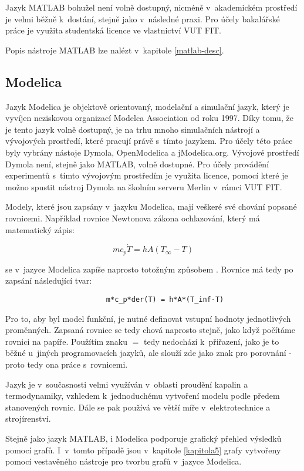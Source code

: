 Jazyk MATLAB bohužel není volně dostupný, nicméně v~akademickém prostředí je velmi běžně k~dostání, stejně jako v~následné praxi. Pro účely bakalářské práce je využita studentská licence ve vlastnictví VUT FIT.

Popis nástroje MATLAB lze nalézt v~kapitole \ref{matlab-desc}.
\subsection{Modelica}
Jazyk Modelica je objektově orientovaný, modelační a simulační jazyk, který je vyvíjen neziskovou organizací Modelca Association od roku 1997. Díky tomu, že je tento jazyk volně dostupný, je na trhu mnoho simulačních nástrojí a vývojových prostředí, které pracují právě s~tímto jazykem. Pro účely této práce byly vybrány nástoje Dymola, OpenModelica a jModelica.org. Vývojové prostředí Dymola není, stejně jako MATLAB, volně dostupné. Pro účely provádění experimentů s~tímto vývojovým prostředím je využita licence, pomocí které je možno spustit nástroj Dymola na školním serveru Merlin v~rámci VUT FIT.

Modely, které jsou zapsány v~jazyku Modelica, mají veškeré své chování popsané rovnicemi. Například rovnice Newtonova zákona ochlazování, který má matematický zápis:

\begin{equation}
    mc_p\Dot{T} = hA(T_{\infty} - T)
\end{equation}

se v~jazyce Modelica zapíše naprosto totožným způsobem \cite{modelica-example}. Rovnice má tedy po zapsání následující tvar:

\begin{verbatim}
                        m*c_p*der(T) = h*A*(T_inf-T)
\end{verbatim}

Pro to, aby byl model funkční, je nutné definovat vstupní hodnoty jednotlivých proměnných. Zapsaná rovnice se tedy chová naprosto stejně, jako když počítáme rovnici na papíře. Použítím znaku $ = $ tedy nedochází k~přiřazení, jako je to běžné u~jiných programovacích jazyků, ale slouží zde jako znak pro porovnání - proto tedy ona práce s~rovnicemi.

Jazyk je v~současnosti velmi využíván v~oblasti proudění kapalin a termodynamiky, vzhledem k~jednoduchému vytvoření modelu podle předem stanovených rovnic. Dále se pak používá ve větší míře v~elektrotechnice a strojírenství.

Stejně jako jazyk MATLAB, i Modelica podporuje grafický přehled výsledků pomocí grafů. I~v~tomto případě jsou v~kapitole \ref{kapitola5} grafy vytvořeny pomocí vestavěného nástroje pro tvorbu grafů v~jazyce Modelica.

